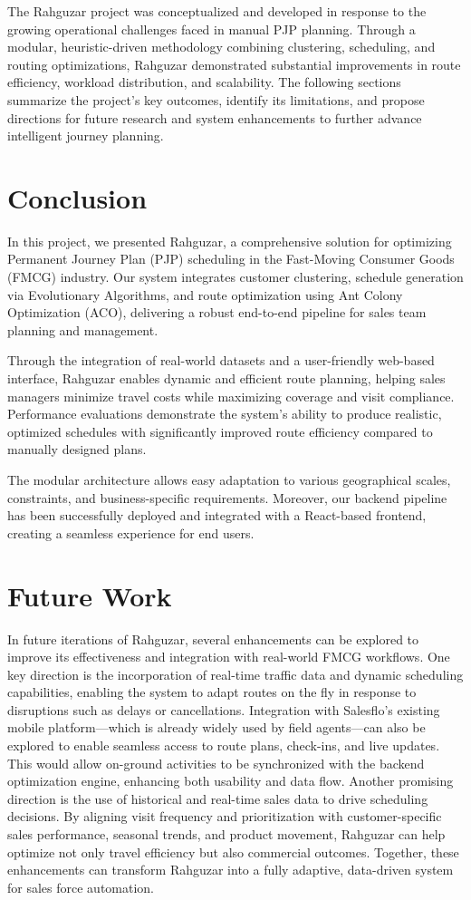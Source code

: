 The Rahguzar project was conceptualized and developed in response to the growing operational challenges faced in manual PJP planning. Through a modular, heuristic-driven methodology combining clustering, scheduling, and routing optimizations, Rahguzar demonstrated substantial improvements in route efficiency, workload distribution, and scalability. The following sections summarize the project’s key outcomes, identify its limitations, and propose directions for future research and system enhancements to further advance intelligent journey planning.

\section{Conclusion}
In this project, we presented Rahguzar, a comprehensive solution for optimizing Permanent Journey Plan (PJP) scheduling in the Fast-Moving Consumer Goods (FMCG) industry. Our system integrates customer clustering, schedule generation via Evolutionary Algorithms, and route optimization using Ant Colony Optimization (ACO), delivering a robust end-to-end pipeline for sales team planning and management.

Through the integration of real-world datasets and a user-friendly web-based interface, Rahguzar enables dynamic and efficient route planning, helping sales managers minimize travel costs while maximizing coverage and visit compliance. Performance evaluations demonstrate the system’s ability to produce realistic, optimized schedules with significantly improved route efficiency compared to manually designed plans.

The modular architecture allows easy adaptation to various geographical scales, constraints, and business-specific requirements. Moreover, our backend pipeline has been successfully deployed and integrated with a React-based frontend, creating a seamless experience for end users.
\section{Future Work}
In future iterations of Rahguzar, several enhancements can be explored to improve its effectiveness and integration with real-world FMCG workflows. One key direction is the incorporation of real-time traffic data and dynamic scheduling capabilities, enabling the system to adapt routes on the fly in response to disruptions such as delays or cancellations. Integration with Salesflo’s existing mobile platform—which is already widely used by field agents—can also be explored to enable seamless access to route plans, check-ins, and live updates. This would allow on-ground activities to be synchronized with the backend optimization engine, enhancing both usability and data flow. Another promising direction is the use of historical and real-time sales data to drive scheduling decisions. By aligning visit frequency and prioritization with customer-specific sales performance, seasonal trends, and product movement, Rahguzar can help optimize not only travel efficiency but also commercial outcomes. Together, these enhancements can transform Rahguzar into a fully adaptive, data-driven system for sales force automation.